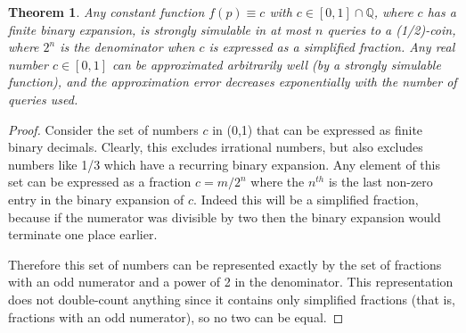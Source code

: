\documentclass{article}
\newtheorem{thm}{Theorem}
\theoremstyle{definition}
\begin{document}
\begin{thm} %
Any constant function $f(p)\equiv c$ with $c \in [0,1]\cap\mathbb{Q}$, where $c$ has a finite binary expansion, is strongly simulable in at most $n$ queries to a (1/2)-coin, where $2^n$ is the denominator when $c$ is expressed as a simplified fraction.
Any real number $c \in [0,1]$ can be approximated arbitrarily well (by a strongly simulable function), and the approximation error decreases exponentially with the number of queries used.
\end{thm}
\begin{proof}
Consider the set of numbers $c$ in (0,1) that can be expressed as finite binary decimals. Clearly, this excludes irrational numbers, but also excludes numbers like 1/3 which have a recurring binary expansion. Any element of this set can be expressed as a fraction $c = m/2^n$ where the $n^{th}$ is the last non-zero entry in the binary expansion of $c$. Indeed this will be a simplified fraction, because if the numerator was divisible by two then the binary expansion would terminate one place earlier.

Therefore this set of numbers can be represented exactly by the set of fractions with an odd numerator and a power of 2 in the denominator. This representation does not double-count anything since it contains only simplified fractions (that is, fractions with an odd numerator), so no two can be equal.


\end{proof}
\end{document}

